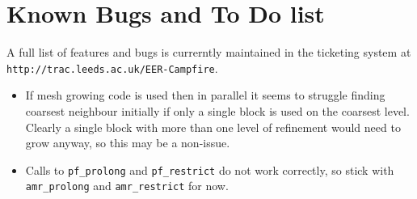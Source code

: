 \documentclass[paper=a4, fontsize=11pt,twoside,bibtotoc]{scrartcl}		%
\begin{document}

\section{Known Bugs and To Do list}
								\label{SEC_Bugs}

A full list of features and bugs is currerntly maintained in the ticketing system at \texttt{http://trac.leeds.ac.uk/EER-Campfire}.

\begin{itemize}
	\item{If mesh growing code is used then in parallel it seems to struggle finding coarsest neighbour initially if only a single block is used on the 
		coarsest level.  Clearly a single block with more than one level of refinement would need to grow anyway, so this may be a non-issue.}
	\item{Calls to \texttt{pf\_prolong} and \texttt{pf\_restrict} do not work correctly, so stick with  \texttt{amr\_prolong} and \texttt{amr\_restrict} for now.}
\end{itemize}


\end{document}
